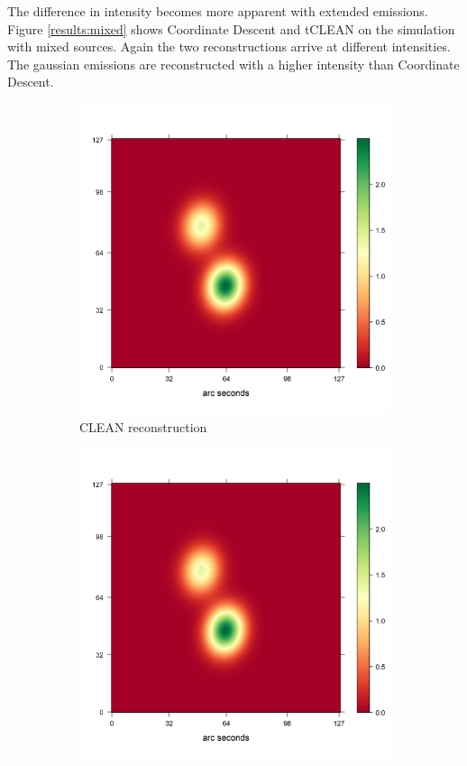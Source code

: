 The difference in intensity becomes more apparent with extended emissions. Figure \ref{results:mixed} shows Coordinate Descent and tCLEAN on the simulation with mixed sources. Again the two reconstructions arrive at different intensities. The gaussian emissions are reconstructed with a higher intensity than Coordinate Descent.

\begin{figure}[h]
	\centering
	\begin{subfigure}[b]{0.4\linewidth}
		\includegraphics[width=\linewidth]{./chapters/20.results/points/tclean_points.png}
		\caption{CLEAN reconstruction}
		\label{results:mixed:tclean}
	\end{subfigure}
	\begin{subfigure}[b]{0.4\linewidth}
		\includegraphics[width=\linewidth]{./chapters/20.results/points/tclean_points.png}

\end{subfigure}
\end{figure}
